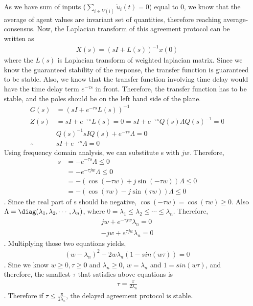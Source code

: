 \documentclass{article}
\begin{document}
\begin{problem}
    As we have sum of inputs ($\sum_{i \in V(i)} \dot u_i(t) = 0$) equal to 0, we know that the average of agent values are invariant set of quantities, therefore reaching average-consensus. Now, the Laplacian transform of this agreement protocol can be written as
    \begin{align*}
        X(s) = (sI + L(s))^{-1} x(0)
    \end{align*}
    where the $L(s)$ is Laplacian transform of weighted laplacian matrix. Since we know the guaranteed stability of the response, the transfer function is guaranteed to be stable. Also, we know that the transfer function involving time delay would have the time delay term $e^{-\tau s}$ in front. Therefore, the transfer function has to be stable, and the poles should be on the left hand side of the plane.
    \begin{align*}
        G(s) &= (sI + e^{-\tau s} L(s))^{-1}\\
        Z(s) &= sI + e^{-\tau s} L(s) = 0 = sI + e^{-\tau s} Q(s) \Lambda Q(s)^{-1} = 0\\
        &Q(s)^{-1} sI Q(s)+ e^{-\tau s} \Lambda = 0\\
        \therefore &sI + e^{-\tau s} \Lambda  = 0
    \end{align*}
    Using frequency domain analysis, we can substitute s with $jw$. Therefore, 
    \begin{align*}
        s & = - e^{-\tau s} \Lambda \leq 0\\
        &= -  e^{-\tau jw} \Lambda \leq 0\\
        &= - (\cos{(-\tau w)}+ j\sin{(-\tau w)})\Lambda \leq 0\\
        &= -(\cos{(\tau w)}- j \sin{(\tau w)})\Lambda \leq 0
    \end{align*}.
    Since the real part of s should be negative, $\cos{(-\tau w)}=\cos{(\tau w)} \geq 0$. Also $\Lambda = \diag (\lambda_1, \lambda_2, \cdots, \lambda_n)$, where $0= \lambda_1 \leq \lambda_2 \leq \cdots \leq \lambda_n$. Therefore,
    \begin{align*}
        jw + e^{-\tau jw} \lambda_n= 0\\
        -jw + e^{\tau jw} \lambda_n= 0
    \end{align*}.
    Multiplying those two equations yields,
    \begin{align*}
        (w - \lambda_n)^2 + 2w\lambda_n(1-sin(w\tau)) = 0
    \end{align*}.
    Sine we know $w \geq 0, \tau \geq 0$ and $\lambda_n \geq 0$, $w = \lambda_n$ and $1 = sin(w\tau)$, and therefore, the smallest $\tau$ that satisfies above equations is
    \begin{align*}
        \tau = \frac{\pi}{2\lambda_n} 
    \end{align*}.
    Therefore if $\tau \leq \frac{\pi}{2\lambda_n}$, the delayed agreement protocol is stable.


\end{problem}
\end{document}
